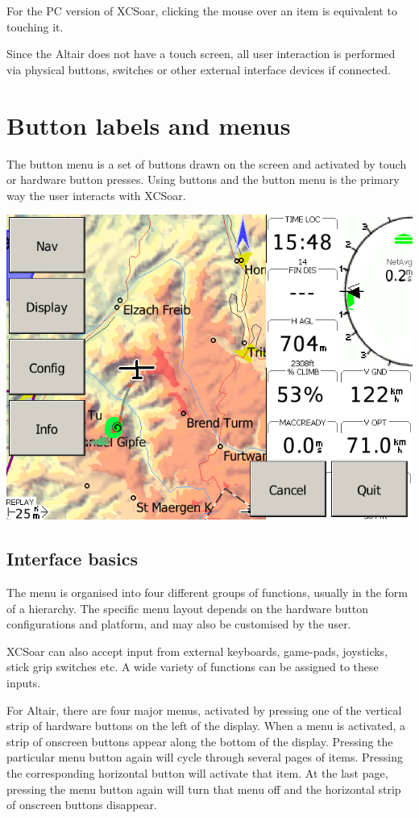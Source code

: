 For the PC version of XCSoar, clicking the mouse over an item is equivalent to
touching it.

Since the Altair does not have a touch screen, all user interaction is performed
via physical buttons, switches or other external interface devices if connected.

\section{Button labels and menus}
The button menu is a set of buttons drawn on the screen and activated by touch
or hardware button presses.  Using buttons and the button menu is the primary
way the user interacts with XCSoar.

\begin{center}
\includegraphics[angle=0,width=\linewidth,keepaspectratio='true']{figures/buttonmenu.png}
\end{center}

\subsection*{Interface basics}
The menu is organised into four different groups of functions, usually in
the form of a hierarchy.  The specific menu layout depends on the
hardware button configurations and platform, and may also be customised by the
user.

XCSoar can also accept input from external keyboards, game-pads, joysticks,
stick grip switches etc. A wide variety of functions can be assigned to these
inputs.

For Altair, there are four major menus, activated by pressing one of
the vertical strip of hardware buttons on the left of the display.
When a menu is activated, a strip of onscreen buttons appear along the 
bottom of the display.  Pressing the particular menu button again will
cycle through several pages of items.  Pressing the corresponding
horizontal button will activate that item.  At the last page, pressing
the menu button again will turn that menu off and the horizontal strip
of onscreen buttons disappear.  

